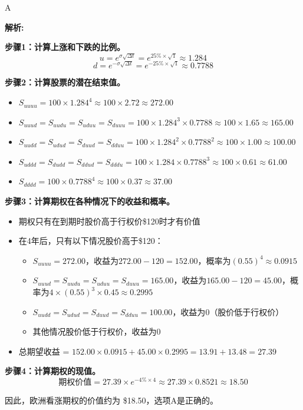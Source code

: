 \documentclass{article}
\newenvironment{explanation}
{\textbf{解析:}\par}
{\par}
\begin{document}
\begin{correctanswer}
   A
\end{correctanswer}

\begin{explanation}
    \textbf{步骤1：计算上涨和下跌的比例。}
    \[
    u = e^{\sigma \sqrt{\Delta t}} = e^{25\% \times \sqrt{1}} \approx 1.284
    \]
    \[
    d = e^{-\sigma \sqrt{\Delta t}} = e^{-25\% \times \sqrt{1}} \approx 0.7788
    \]

    \textbf{步骤2：计算股票的潜在结束值。}
    \begin{itemize}
        \item \( S_{uuuu} = 100 \times 1.284^4 \approx 100 \times 2.72 \approx 272.00 \)
        \item \( S_{uuud} = S_{uudu} = S_{uduu} = S_{duuu} = 100 \times 1.284^3 \times 0.7788 \approx 100 \times 1.65 \approx 165.00 \)
        \item \( S_{uudd} = S_{udud} = S_{duud} = S_{dduu} = 100 \times 1.284^2 \times 0.7788^2 \approx 100 \times 1.00 \approx 100.00 \)
        \item \( S_{uddd} = S_{dudd} = S_{ddud} = S_{dddu} = 100 \times 1.284 \times 0.7788^3 \approx 100 \times 0.61 \approx 61.00 \)
        \item \( S_{dddd} = 100 \times 0.7788^4 \approx 100 \times 0.37 \approx 37.00 \)
    \end{itemize}

    \textbf{步骤3：计算期权在各种情况下的收益和概率。}
    \begin{itemize}
        \item 期权只有在到期时股价高于行权价\$120时才有价值
        \item 在4年后，只有以下情况股价高于\$120：
            \begin{itemize}
                \item \(S_{uuuu} = 272.00\)，收益为\(272.00 - 120 = 152.00\)，概率为\((0.55)^4 \approx 0.0915\)
                \item \(S_{uuud} = S_{uudu} = S_{uduu} = S_{duuu} = 165.00\)，收益为\(165.00 - 120 = 45.00\)，概率为\(4 \times (0.55)^3 \times 0.45 \approx 0.2995\)
                \item \(S_{uudd} = S_{udud} = S_{duud} = S_{dduu} = 100.00\)，收益为\(0\)（股价低于行权价）
                \item 其他情况股价低于行权价，收益为\(0\)
            \end{itemize}
        \item 总期望收益 = \(152.00 \times 0.0915 + 45.00 \times 0.2995 = 13.91 + 13.48 = 27.39\)
    \end{itemize}

    \textbf{步骤4：计算期权的现值。}
    \[
    \text{期权价值} = 27.39 \times e^{-4\% \times 4} \approx 27.39 \times 0.8521 \approx 18.50
    \]

    因此，欧洲看涨期权的价值约为 \$18.50，选项A是正确的。
\end{explanation}
\end{document}

